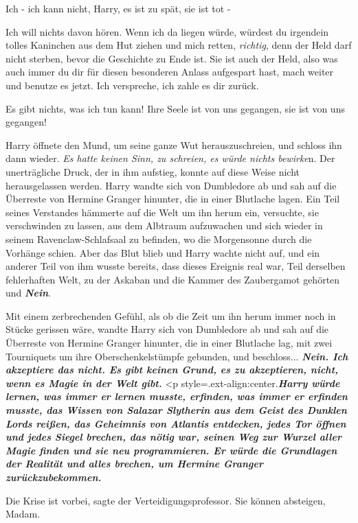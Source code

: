 \glqq{}Ich - ich kann nicht, Harry, es ist zu spät, sie ist tot -\grqq{}

\glqq{}Ich will nichts davon hören. Wenn ich da liegen würde, würdest du
irgendein tolles Kaninchen aus dem Hut ziehen und mich retten, \emph{richtig},
denn der Held darf nicht sterben, bevor die Geschichte zu Ende ist. Sie ist auch
der Held, also was auch immer du dir für diesen besonderen Anlass aufgespart
hast, mach weiter und benutze es jetzt. Ich verspreche, ich zahle es dir
zurück.\grqq{}

\glqq{}Es gibt nichts, was ich tun kann! Ihre Seele ist von uns gegangen, sie ist
von uns gegangen!\grqq{}

Harry öffnete den Mund, um seine ganze Wut herauszuschreien, und schloss ihn
dann wieder. \emph{Es hatte keinen Sinn, zu schreien, es würde nichts bewirke}n.
Der unerträgliche Druck, der in ihm aufstieg, konnte auf diese Weise nicht
herausgelassen werden. Harry wandte sich von Dumbledore ab und sah auf die
Überreste von Hermine Granger hinunter, die in einer Blutlache lagen. Ein Teil
seines Verstandes hämmerte auf die Welt um ihn herum ein, versuchte, sie
verschwinden zu lassen, aus dem Albtraum aufzuwachen und sich wieder in seinem
Ravenclaw-Schlafsaal zu befinden, wo die Morgensonne durch die Vorhänge schien.
Aber das Blut blieb und Harry wachte nicht auf, und ein anderer Teil von ihm
wusste bereits, dass dieses Ereignis real war, Teil derselben fehlerhaften Welt,
zu der Askaban und die Kammer des Zaubergamot gehörten und \textbf{\emph{Nein}}.

Mit einem zerbrechenden Gefühl, als ob die Zeit um ihn herum immer noch in
Stücke gerissen wäre, wandte Harry sich von Dumbledore ab und sah auf die
Überreste von Hermine Granger hinunter, die in einer Blutlache lag, mit zwei
Tourniquets um ihre Oberschenkelstümpfe gebunden, und beschloss...
\textbf{}
\textbf{\emph{Nein. Ich akzeptiere das
nicht. Es gibt keinen Grund, es zu akzeptieren, nicht, wenn es Magie in der Welt
gibt.}}    \textbf{}  <p
style=\grqq{}.ext-align:center\grqq{}.\textbf{\emph{Harry würde lernen, was
immer er lernen musste, erfinden, was immer er erfinden musste, das Wissen von
Salazar Slytherin aus dem Geist des Dunklen Lords reißen, das Geheimnis von
Atlantis entdecken, jedes Tor öffnen und jedes Siegel brechen, das nötig war,
seinen Weg zur Wurzel aller Magie finden und sie neu programmieren. Er würde die
Grundlagen der Realität und alles brechen, um Hermine Granger
zurückzubekommen.}}

\glqq{}Die Krise ist vorbei\grqq{}, sagte der Verteidigungsprofessor. \glqq{}Sie
können absteigen, Madam.\grqq{}

